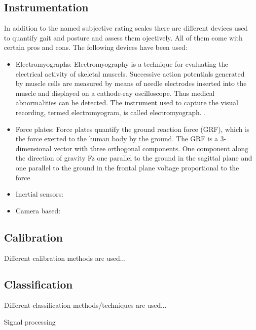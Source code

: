 \subsection{Instrumentation}

In addition to the named subjective rating scales there are different devices used to quantify gait and posture and assess them ojectively. All of them come with certain pros and cons. The following devices have been used:

\begin{itemize}

\item Electromyographs: Electromyography is a technique for evaluating the electrical activity of skeletal muscels. Successive action potentials generated by muscle cells are measured by means of needle electrodes inserted into the muscle and displayed on a cathode-ray oscilloscope. Thus medical abnormalities can be detected. The instrument used to capture the visual recording, termed electromyogram, is called electromyograph. \cite{encyclopedia_britannica_electromyography_2014}.

\item Force plates: Force plates quantify the ground reaction force (GRF), which is the force exerted to the human body by the ground. The GRF is a 3-dimensional vector with three orthogonal components. One component along the direction of gravity Fz one parallel to the ground in the sagittal plane and one parallel to the ground in the frontal plane voltage proportional to the force

\item Inertial sensors:

\item Camera based:

\end{itemize}

\subsection{Calibration}

Different calibration methods are used...


\subsection{Classification}

Different classification methods/techniques are used...

Signal processing

